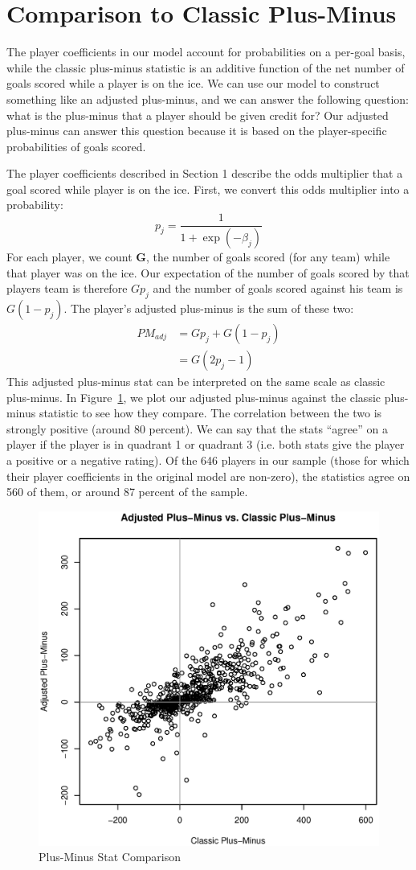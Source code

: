 \documentclass[11pt, fleqn]{article}
\begin{document}
\section{Comparison to Classic Plus-Minus}

The player coefficients in our model account for probabilities on a per-goal basis, while the classic plus-minus statistic is an additive function of the net number of goals scored while a player is on the ice. We can use our model to construct something like an adjusted plus-minus, and we can answer the following question: what is the plus-minus that a player should be given credit for? Our adjusted plus-minus can answer this question because it is based on the player-specific probabilities of goals scored.

The player coefficients described in Section 1 describe the odds multiplier that a goal scored while player is on the ice. First, we convert this odds multiplier into a probability:
\[ p_j = \frac{1}{1+\exp \left(-\beta_j\right)} \]
For each player, we count \textbf{G}, the number of goals scored (for any team) while that player was on the ice. Our expectation of the number of goals scored by that players team is therefore $G p_j$ and the number of goals scored against his team is $G (1-p_j)$. The player's adjusted plus-minus is the sum of these two:
\begin{align*} 
PM_{adj} & = G p_j + G (1-p_j) \\
 & = G (2 p_j - 1)
\end{align*}
This adjusted plus-minus stat can be interpreted on the same scale as classic plus-minus. In Figure~\ref{fig:pm_compare}, we plot our adjusted plus-minus against the classic plus-minus statistic to see how they compare. The correlation between the two is strongly positive (around 80 percent). We can say that the stats ``agree'' on a player if the player is in quadrant 1 or quadrant 3 (i.e. both stats give the player a positive or a negative rating). Of the 646 players in our sample (those for which their player coefficients in the original model are non-zero), the statistics agree on 560 of them, or around 87 percent of the sample.

\begin{figure}[!htb]
  \centering
  \includegraphics[scale=.5]{pm_compare.eps}
  \caption{Plus-Minus Stat Comparison}
  \label{fig:pm_compare}
\end{figure}
\end{document}
